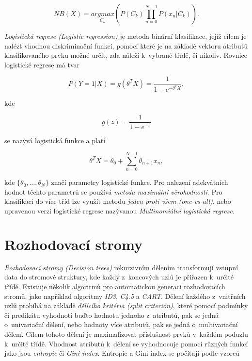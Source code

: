 \begin{equation}
	NB(X) = \underset{C_k}{argmax}(P(C_k) \prod\limits_{n=0}^{N-1} P(x_n|C_k)).
\end{equation}
\cite{data_classification}\cite{machine_learning}

\medskip

\textit{Logistická regrese (Logistic regression)} je metoda binární klasifikace, jejíž cílem je nalézt vhodnou diskriminační funkci, pomocí které je na základě vektoru atributů klasifikovaného prvku možné určit, zda náleží k~vybrané třídě, či nikoliv. Rovnice logistické regrese má tvar

\begin{equation}
    P(Y=1|X) = g(\theta^T X) = \frac{1}{1-e^{-\theta^T X}},
\end{equation}

\medskip

\noindent kde 

\begin{equation}
    g(z) = \frac{1}{1-e^{-z}}
\end{equation}

\medskip

\noindent se nazývá logistická funkce a platí

\begin{equation}
    \theta^T X = \theta_0 + \sum\limits_{n=0}^{N-1} \theta_{n+1} x_n,
\end{equation}

\medskip

\noindent kde $\{\theta_0, \dots, \theta_N\}$ značí parametry logistické funkce. Pro nalezení adekvátních hodnot těchto parametrů se používá \textit{metoda maximální věrohodnosti}. Pro klasifikaci do více tříd lze využít metodu \textit{jeden proti všem (one-vs-all)}, nebo upravenou verzi logistické regrese nazývanou \textit{Multinomiální logistická regrese}.

\cite{data_classification}\cite{understanding_machine_learning}

\section{Rozhodovací stromy}
\label{rozhodovaci_stromy}
\textit{Rozhodovací stromy (Decision trees)} rekurzivním dělením transformují vstupní data do stromové struktury, kde každý z~koncových uzlů je přiřazen k~určité třídě. Existuje několik algoritmů pro automatickou generaci rozhodovacích stromů, jako například algoritmy \textit{ID3}, \textit{C4.5} a \textit{CART}. Dělení každého z~vnitřních uzlů probíhá na základě \textit{dělícího kritéria (split criterion)}, které pomocí podmínky či predikátu vyhodnotí buďto hodnotu jednoho z~atributů, pak se jedná o~univariační dělení, nebo hodnoty více atributů, pak se jedná o~multivariační dělení. Cílem tohoto dělení je maximalizovat příslušnost prvků v~každém poduzlu k~určité třídě. Vhodnost atributů k~dělení se vyhodnocuje pomocí různých funkcí jako jsou \textit{entropie} či \textit{Gini index}. Entropie a Gini index se počítají podle vzorců

